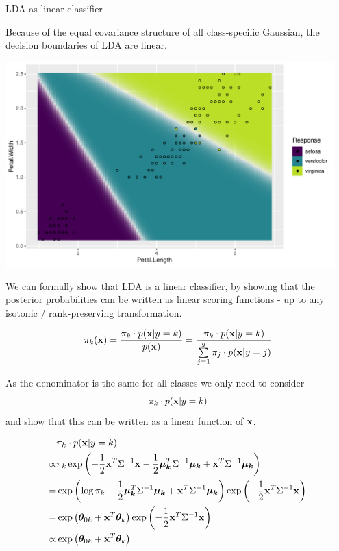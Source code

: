 \documentclass[11pt,compress,t,notes=noshow, xcolor=table]{beamer}
\begin{document}
\begin{vbframe}{LDA as linear classifier}

  Because of the equal covariance structure of all class-specific Gaussian, the decision boundaries
  of LDA are linear.

\begin{knitrout}\scriptsize
{}\color{fgcolor}

{\centering \includegraphics[width=0.95\textwidth]{figure/reg_class_dis_2} 

}



\end{knitrout}

\framebreak


We can formally show that LDA is a linear classifier, by showing that the posterior probabilities
can be written as linear scoring functions - up to any isotonic / rank-preserving transformation.

$$
  \pikx = \frac{\pik \cdot \pdfxyk }{\pdfx} = \frac{\pik \cdot \pdfxyk}{\sumjg \pi_j \cdot \pdfxyk[j]}
$$

As the denominator is the same for all classes we only need to consider 
$$\pik \cdot \pdfxyk$$ 
and show that this can be written as a linear function of $\xv$.

\framebreak


\begin{eqnarray*}
& \pik \cdot \pdfxyk \\
  \propto& \pik \exp\left(- \frac{1}{2} \xv^T\Sigma^{-1}\xv - \frac{1}{2} \muk^T \Sigma^{-1} \muk + \xv^T \Sigma^{-1} \muk \right) \\
=& \exp\left(\log \pik  - \frac{1}{2} \muk^T \Sigma^{-1} \muk + \xv^T \Sigma^{-1} \muk \right) \exp\left(- \frac{1}{2} \xv^T\Sigma^{-1}\xv\right) \\
=& \exp\left(\thetab_{0k} + \xv^T \thetab_k\right) \exp\left(- \frac{1}{2} \xv^T\Sigma^{-1}\xv\right)\\
\propto& \exp\left(\thetab_{0k} + \xv^T \thetab_k\right) 
\end{eqnarray*}


\end{vbframe}
\end{document}
